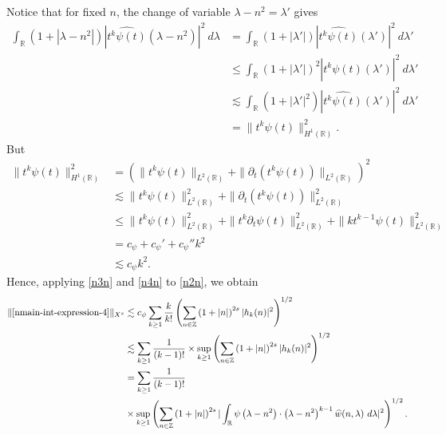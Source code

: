 \documentclass[12pt,reqno]{amsart}
\numberwithin{equation}{section}  %
\newcommand{\rr}{\mathbb{R}}
\newcommand{\zz}{\mathbb{Z}}
\newcommand{\wh}{\widehat}
\newcommand{\p}{\partial}
\begin{document}
%
%
Notice that for fixed $n$, the change of variable $\lambda - n^{2} = \lambda'$
gives
%
%
\begin{equation}
	\label{n3n}
	\begin{split}
		\int_\rr \left( 1 + | \lambda - n^{2} | \right) | \wh{t^{k}
		\psi(t)}\left( \lambda - n^{2} \right) |^2 \ d \lambda
		& = \int_\rr \left( 1 + |\lambda'| \right) | \wh{t^k \psi(t)}(\lambda') |^2 \
		d \lambda'
		\\
		& \le \int_\rr \left( 1 + |\lambda'| \right)^2 | \wh{t^k \psi(t)}(\lambda')
		|^2 \ d \lambda'
		\\
		& \lesssim \int_\rr \left( 1 + | \lambda' |^2 \right) | \wh{t^{k}
		\psi(t)}(\lambda') |^2 \ d \lambda'
		\\
		& = \|t^k \psi(t) \|_{H^1(\rr)}^2.
	\end{split}
\end{equation}
%
%
But
%
%
\begin{equation}
	\label{n4n}
	\begin{split}
		\|t^k \psi(t) \|_{H^1(\rr)}^2
		& = \left( \|t^k \psi(t)\|_{L^2(\rr)} + \|\p_t \left( t^k \psi(t)
		\right)\|_{L^2(\rr)} \right)^2
		\\
		& \lesssim \|t^{k}\psi(t) \|_{L^2(\rr)}^2 + \|\p_t \left (t^{k}
		\psi(t) \right )\|_{L^2(\rr)}^2
		\\
		& \le \|t^k \psi(t) \|_{L^2(\rr)}^2 + \|t^k \p_t \psi(t)
		\|_{L^2(\rr)}^2 + \|k t^{k -1} \psi(t) \|_{L^2(\rr)}^2
		\\
		& = c_{\psi} + c_{\psi}' + c_{\psi}''k^2 
		\\
    & \lesssim c_{\psi} k^2.
	\end{split}
\end{equation}
%
%
Hence, applying \eqref{n3n} and \eqref{n4n} to \eqref{n2n}, we obtain
%
\begin{equation}
	\label{n5n}
	\begin{split}
		\|\eqref{nmain-int-expression-4} \|_{X^s}
		& \lesssim
    c_{\psi}\sum_{k \ge 1} \frac{k}{k!} \left( \sum_{n \in \zz} \left (1 + |n| \right )^{2s} | h_k(n) |^2 
		\right)^{1/2}
		\\
		& \lesssim \sum_{k \ge 1} \frac{1}{(k-1)!}
		\times \sup_{k \ge 1} \left( \sum_{n \in \zz} \left (1 + |n| \right )^{2s} | 
		h_k(n) |^2 \right)^{1/2}
		\\
		& = \sum_{k \ge 1} \frac{1}{(k-1)!}
    \\
    & \times \sup_{k \ge 1} 
		\left( \sum_{n \in \zz} \left (1 + |n| \right )^{2s} |\int_\rr 
		\psi\left( \lambda - n^{2} \right) \cdot \left( \lambda - n^{2} 
    \right)^{k -1} \wh{w}(n, \lambda) \ d \lambda|^{2} \right)^{1/2}.
    	\end{split}
\end{equation}
\end{document}
